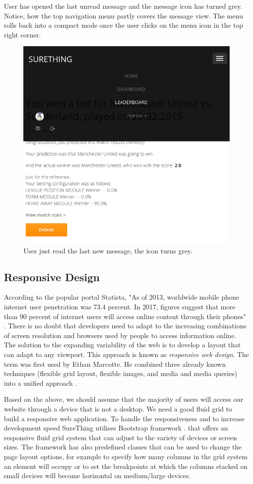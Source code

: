User has opened the last unread message and the message icon has turned grey. Notice, how the top navigation menu partly covers the message view. The menu rolls back into a compact mode once the user clicks on the menu icon in the top right corner.

\begin{figure}[H]
	\begin{center}
		\includegraphics[width=.60\columnwidth]{impl/images/noMoreNewMessages}
		\caption{User just read the last new message, the icon turns grey.} \label{fig:nomorenewmessages}
	\end{center}
\end{figure}

\subsection{Responsive Design}
According to the popular portal Statista, "As of 2013, worldwide mobile phone internet user penetration was 73.4 percent. In 2017, figures suggest that more than 90 percent of internet users will access online content through their phones" \cite{statistaReport}. There is no doubt that developers need to adapt to the increasing combinations of screen resolution and browsers used by people to access information online. The solution to the expanding variability of the web is to develop a layout that can adapt to any viewport. This approach is known as \emph{responsive web design}. The term was first used by Ethan Marcotte. He combined three already known techniques (flexible grid layout, flexible images, and media and media queries) into a unified approach \cite{book:frain2012responsive}. 

Based on the above, we should assume that the majority of users will access our website through a device that is not a desktop. We need a good fluid grid to build a responsive web application. To handle the responsiveness and to increase development speed SureThing utilises Bootstrap framework \cite{documentation:Bootstrap3}. that offers an responsive fluid grid system that can adjust to the variety of devices or screen sizes. The framework has also predefined classes that can be used to change the page layout options, for example to specify how many columns in the grid system an element will occupy or to set the breakpoints at which the columns stacked on small devices will become horizontal on medium/large devices. 

